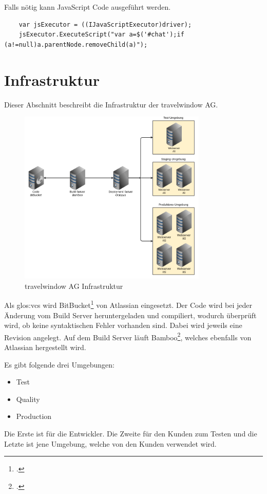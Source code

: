 Falls nötig kann JavaScript Code ausgeführt werden.

\begin{lstlisting}
	var jsExecutor = ((IJavaScriptExecutor)driver);
	jsExecutor.ExecuteScript("var a=$('#chat');if (a!=null)a.parentNode.removeChild(a)");
\end{lstlisting}


\section{Infrastruktur}
\label{sec:umsetzung:infrastruktur}
Dieser Abschnitt beschreibt die Infrastruktur der travelwindow AG.

\begin{figure}[H]
	\centering
	\includegraphics[width=0.8\textwidth]{images/trv infrastructure.png}
	\caption{travelwindow AG Infrastruktur}
	\label{fig:umsetzung:infrastruktur}
\end{figure}

Als \Gls{glos:vcs} wird BitBucket\footcite{Git_and_Mercurial_code_management_for_teams_2015-07-26} von Atlassian eingesetzt. Der Code wird bei jeder Änderung vom Build Server heruntergeladen und compiliert, wodurch überprüft wird, ob keine syntaktischen Fehler vorhanden sind. Dabei wird jeweils eine Revision angelegt. Auf dem Build Server läuft Bamboo\footcite{Bamboo_2015-07-26}, welches ebenfalls von Atlassian hergestellt wird. 

Es gibt folgende drei Umgebungen:
\begin{itemize}
\item Test
\item Quality
\item Production
\end{itemize}
Die Erste ist für die Entwickler. Die Zweite für den Kunden zum Testen und die Letzte ist jene Umgebung, welche von den Kunden verwendet wird.

